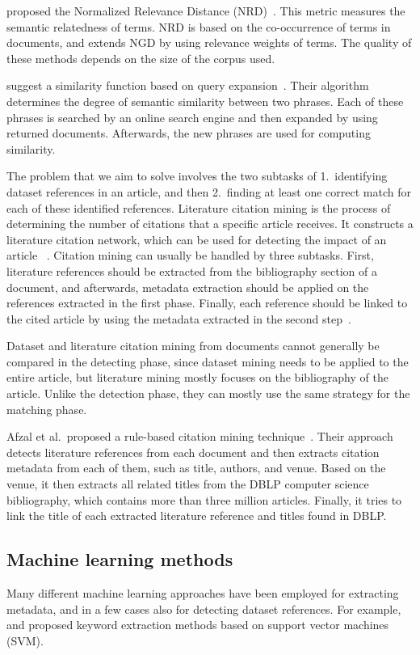 \documentclass{IOS-Book-Article}
\begin{document}
\citeauthor{Schaefer2014} proposed the Normalized Relevance Distance (NRD)~\cite{Schaefer2014}.
This metric measures the semantic relatedness of terms.
NRD is based on the co-occurrence of terms in documents, and extends NGD by using relevance weights of terms.
The quality of these methods depends on the size of the corpus used.

\citeauthor{Sahami2006} suggest a similarity function based on query expansion~\cite{Sahami2006}.
Their algorithm determines the degree of semantic similarity between two phrases.
Each of these phrases is searched by an online search engine and then expanded by using returned documents.
Afterwards, the new phrases are used for computing similarity. 

The problem that we aim to solve involves the two subtasks of 1.\ identifying dataset references in an article, and then 2.\ finding at least one correct match for each of these identified references.
Literature citation mining is the process of determining the number of citations that a specific article receives.
It constructs a literature citation network, which can be used for detecting the impact of an article~
\cite{Afzal2010}.
Citation mining can usually be handled by three subtasks.
First, literature references should be extracted from the bibliography section of a document, and afterwards, metadata extraction should be applied on the references extracted in the first phase.
Finally, each reference should be linked to the cited article by using the metadata extracted in the second step~\cite{Afzal2010}.

Dataset and literature citation mining from documents cannot generally be compared in the detecting phase, since dataset mining needs to be applied to the entire article, but literature mining mostly focuses on the bibliography of the article. 
Unlike the detection phase, they can mostly use the same strategy for the matching phase. 

Afzal et al.\ proposed a rule-based citation mining technique~\cite{Afzal2010}.
Their approach detects literature references from each document and then extracts citation metadata from each of them, such as title, authors, and venue. Based on the venue, it then extracts all related titles from the DBLP computer science bibliography, which contains more than three million articles.
Finally, it tries to link the title of each extracted literature reference and titles found in DBLP.

\subsection{Machine learning methods}
Many different machine learning approaches have been employed for extracting metadata, and in a few cases also for detecting dataset references.
For example, \citeauthor{Zhang2006} \cite{Zhang2006} and \citeauthor{Han2003} \cite{Han2003} proposed keyword extraction methods based on support vector machines (SVM). 
\end{document}
